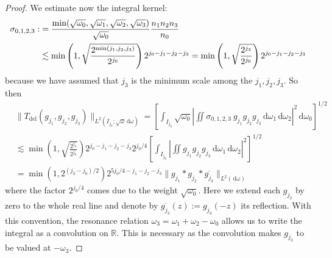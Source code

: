 \documentclass[10pt,a4paper]{amsart}
\newcommand{\dd}{{\, \mathrm d}}
\begin{document}
\begin{proof}
        We estimate now the integral kernel:
        \begin{align}
            \sigma_{0,1,2,3}:&= \frac{\text{min}(\sqrt{\omega_0},\sqrt{\omega_1},\sqrt{\omega_2},\sqrt{\omega_3})}{\sqrt{\omega_0}} 
   \frac{n_1n_2n_3}{n_0}\notag \\
   &\lesssim \min \left(1,
   \sqrt{
   \frac{2^{\min(j_1,j_2,j_3)}}{2^{j_0}} 
   } \right) 2^{j_0 - j_1-j_2-j_3}  = \min \left(1,
   \sqrt{
   \frac{2^{j_3}}{2^{j_0}} 
   } \right) 2^{j_0 - j_1-j_2-j_3}
        \end{align}
        because we have assumed that $j_3$ is the minimum scale among the $j_1,j_2,j_3$. So then 
        \begin{equation} \label{eq:cubic term_dydadic}
            \begin{split}
                &\|T_{\text{del}}(g_{j_1},g_{j_2},g_{j_3})  \|_{L^2(I_{j_0};\sqrt{\omega}\dd \omega)}   = 
                \left[ \int_{I_{j_0}}\sqrt{\omega_0} \left\vert
                \iint \sigma_{0,1,2,3}  \ g_{j_1}g_{j_2}g_{j_3} \dd \omega_1 \dd \omega_2 
                \right\vert^2 \dd \omega_0\right]^{1/2}\\
                & \lesssim \min \left(1, \sqrt{
     \frac{2^{j_3}}{2^{j_0}} 
   } \right) 2^{j_0-j_1-j_2-j_3} 2^{j_0/4} 
   \left[ \int_{I_{j_0}}  \left\vert 
   \iint g_{j_1}g_{j_2}g_{j_3}\dd \omega_1\dd \omega_2
   \right\vert^2
   \right]^{1/2} \\
   &  = \min \left(1, 2^{(j_3-j_0)/2} \right) 2^{5 j_0/4-j_1-j_2-j_3}
   \| g_{j_1} \ast g_{j_2} \ast \overline{g_{j_3}} \|_{L^2(\dd \omega)}
            \end{split}
        \end{equation}
        where the factor $2^{j_0/4}$ comes due to the weight $\sqrt{\omega_0}$. Here we extend each $g_{j_3}$ by zero to the whole real line and denote by
$\overline{g_{j_3}}(z):=g_{j_3}(-z)$ its reflection. With this convention,
the resonance relation $\omega_3=\omega_1+\omega_2-\omega_0$ allows us to write the integral as a convolution on $\mathbb{R}$. This is necessary as the convolution makes $g_{j_3}$ to be valued at $-\omega_3$. 
        

\end{proof}
\end{document}
